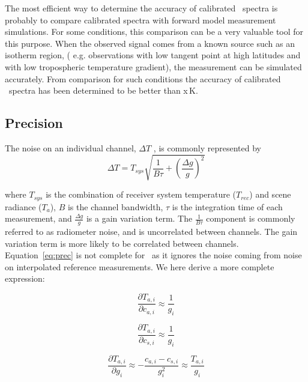 The most efficient way to determine the accuracy of calibrated \smr\ spectra
is probably to compare calibrated spectra with forward model measurement
simulations. For some conditions, this comparison can be a very valuable
tool for this purpose.
When the observed signal comes from a known source such as an isotherm
region,  ( e.g. observations with low tangent point at high latitudes 
and with low tropospheric temperature gradient),
the measurement can be simulated accurately.
From comparison for such conditions the accuracy of calibrated
\smr\ spectra has been determined to be better than x\,K.
 


\subsection*{Precision}


The noise on an individual channel, \(\Delta T\) , is commonly represented by
\begin{equation}
\Delta T = T_{sys}\sqrt{ \frac{1}{B\tau} + \left( \frac{\Delta g}{g} \right)^2 }
\label{eq:prec}
\end{equation}

where \(T_{sys}\) is the combination of receiver system temperature (\(T_{rec}\)) and
scene radiance (\(T_{a}\)), \(B\) is the channel bandwidth,
\(\tau\) is the integration time of each measurement, and \(\frac{\Delta g}{g}\)
is a gain variation term. The \(\frac{1}{B\tau}\) component is commonly referred to as
radiometer noise, and is uncorrelated between channels.
The gain variation term is more likely to be correlated between channels.
Equation~\ref{eq:prec} is not complete for \smr\ as it ignores the noise
coming from noise on interpolated reference measurements.
We here derive a more complete expression:

\begin{equation}
\frac{\partial T_{a,i}}{\partial c_{a,i}} \approx \frac{1}{g_i} 
\end{equation}

\begin{equation}
\frac{\partial T_{a,i}}{\partial c_{s,i}} \approx \frac{1}{g_i} 
\end{equation}

\begin{equation}
\frac{\partial T_{a,i}}{\partial g_{i}} \approx -\frac{c_{a,i}-c_{s,i}}{g_{i}^{2}} \approx \frac{T_{a,i}}{g_i} 
\end{equation}

